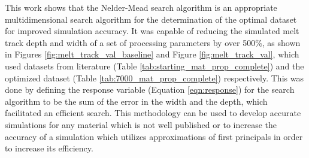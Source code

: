 \label{conclusions}

This work shows that the Nelder-Mead search algorithm is an appropriate multidimensional search algorithm for the determination of the optimal dataset for improved simulation accuracy.  It was capable of reducing the simulated melt track depth and width of a set of processing parameters by over 500\%, as shown in Figures \ref{fig:melt_track_val_baseline} and Figure \ref{fig:melt_track_val}, which used datasets from literature (Table \ref{tab:starting_mat_prop_complete}) and the optimized dataset (Table \ref{tab:7000_mat_prop_complete}) respectively.  This was done by defining the response variable (Equation \ref{eqn:response}) for the search algorithm to be the sum of the error in the width and the depth, which facilitated an efficient search.  
This methodology can be used to develop accurate simulations for any material which is not well published or to increase the accuracy of a simulation which utilizes approximations of first principals in order to increase its efficiency.
